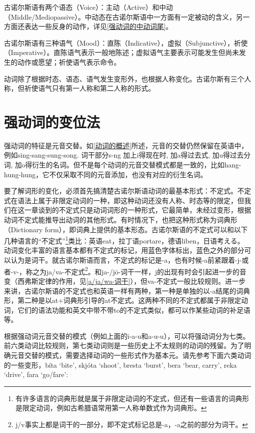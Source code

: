 古诺尔斯语有两个语态（Voice）：主动（Active）和中动（Middle/Mediopassive）。中动态在古诺尔斯语中一方面有一定被动的含义，另一方面还表达一些反身的动作，详见\ref{强动词的中动词尾}。

古诺尔斯语有三种语气（Mood）：直陈（Indicative），虚拟（Subjunctive），祈使（Imperative）。直陈语气表示一般地陈述；虚拟语气主要表示可能发生但尚未发生的动作或愿望；祈使语气表示命令。

动词除了根据时态、语态、语气发生变形外，也根据人称变化。古诺尔斯有三个人称，但祈使语气只有第一人称和第二人称的形式。

\section{强动词的变位法}\label{强动词的变位法}

强动词的特征是元音交替。如\ref{动词的概述}所述，元音的交替仍然保留在英语中，例如sing-sang-sung-song.
词干部分s-ng 加上i得现在时, 加a得过去式, 加u得过去分词,
加o得衍生的名词。但不是每个动词的元音交替模式都是一致的，比如hang-hung-hung，它不仅采取不同的元音添加，也没有对应的衍生名词。

要了解词形的变化，必须首先搞清楚古诺尔斯语动词的最基本形式：不定式。不定式在语法上属于非限定动词的一种，即这种动词还没有人称、时态等的限定，但我们在这一章谈到的不定式只是动词词形的一种形式，它最简单，未经过变形，根据动词不定式能推导出动词的其他形式。有时情况下，也把这种形式称为词典形（Dictionary
form），即词典上提供的基本形态。古诺尔斯语的不定式可以和以下几种语言的``不定式''\footnote{有许多语言的词典形就是属于非限定动词的不定式，但还有一些语言的词典形是限定动词，例如古希腊语常用第一人称单数式作为词典形。}类比：英语eat，拉丁语portare，德语liben，日语考える。动词变化丰富的语言基本都有不定式的标记，用蓝色字体标出，蓝色之外的部分可以认为是词干。就古诺尔斯语而言，不定式的标记是-a，也有时候-a前紧跟着-j-或者-v-，称之为ja/va-不定式\footnote{j/v事实上都是词干的一部分，即不定式标记总是-a，-a之前的部分为词干。}。和ja-/jō-词干一样，j的出现有时会引起进一步的音变（西弗斯定律的作用，见\ref{a/ja/wa-词干}），但va-不定式一般比较规则。进一步来讲，古诺尔斯语的不定式也和英语一样有两种，第一种是单独的以-a结尾的词典形，第二种是以at+词典形引导的at不定式。这两种不同的不定式都属于非限定动词，它们的语法功能和英文中带不带to的不定式类似，都可以作某些动词的补足语等。

根据强动词元音交替的模式（例如上面的i-a-u和a-u-u），可以将强动词分为七类。前六类动词比较规则，第七类动词则是一些历史上不太规则的动词的残留。为了明确元音交替的模式，需要选择动词的一些形式作为基本元。请先参考下面六类动词的一些变形，bíta
`bite', skjóta `shoot', bresta `burst', bera `bear, carry', reka
`drive‌', fara `go/fare‌':

